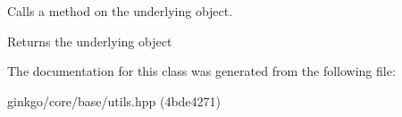 Calls a method on the underlying object. 

\begin{DoxyReturn}{Returns}
the underlying object 
\end{DoxyReturn}


The documentation for this class was generated from the following file\+:\begin{DoxyCompactItemize}
\item 
ginkgo/core/base/utils.\+hpp (4bde4271)\end{DoxyCompactItemize}
